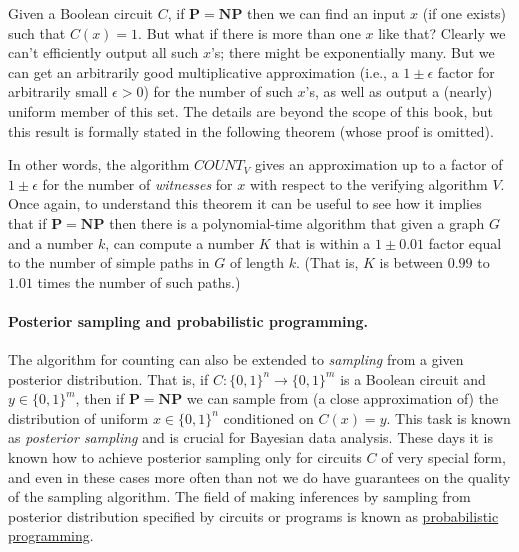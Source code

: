 Given a Boolean circuit \(C\), if \(\mathbf{P}=\mathbf{NP}\) then we can
find an input \(x\) (if one exists) such that \(C(x)=1\). But what if
there is more than one \(x\) like that? Clearly we can't efficiently
output all such \(x\)'s; there might be exponentially many. But we can
get an arbitrarily good multiplicative approximation (i.e., a
\(1\pm \epsilon\) factor for arbitrarily small \(\epsilon>0\)) for the
number of such \(x\)'s, as well as output a (nearly) uniform member of
this set. The details are beyond the scope of this book, but this result
is formally stated in the following theorem (whose proof is omitted).

\hypertarget{approxcountingnp}{}

In other words, the algorithm \(\ensuremath{\mathit{COUNT}}_V\) gives an
approximation up to a factor of \(1 \pm \epsilon\) for the number of
\emph{witnesses} for \(x\) with respect to the verifying algorithm
\(V\). Once again, to understand this theorem it can be useful to see
how it implies that if \(\mathbf{P}=\mathbf{NP}\) then there is a
polynomial-time algorithm that given a graph \(G\) and a number \(k\),
can compute a number \(K\) that is within a \(1 \pm 0.01\) factor equal
to the number of simple paths in \(G\) of length \(k\). (That is, \(K\)
is between \(0.99\) to \(1.01\) times the number of such paths.)

\paragraph{Posterior sampling and probabilistic programming.} The
algorithm for counting can also be extended to \emph{sampling} from a
given posterior distribution. That is, if
\(C:\{0,1\}^n \rightarrow \{0,1\}^m\) is a Boolean circuit and
\(y\in \{0,1\}^m\), then if \(\mathbf{P}=\mathbf{NP}\) we can sample
from (a close approximation of) the distribution of uniform
\(x\in \{0,1\}^n\) conditioned on \(C(x)=y\). This task is known as
\emph{posterior sampling} and is crucial for Bayesian data analysis.
These days it is known how to achieve posterior sampling only for
circuits \(C\) of very special form, and even in these cases more often
than not we do have guarantees on the quality of the sampling algorithm.
The field of making inferences by sampling from posterior distribution
specified by circuits or programs is known as
\href{https://en.wikipedia.org/wiki/Probabilistic_programming_language}{probabilistic
programming}.

